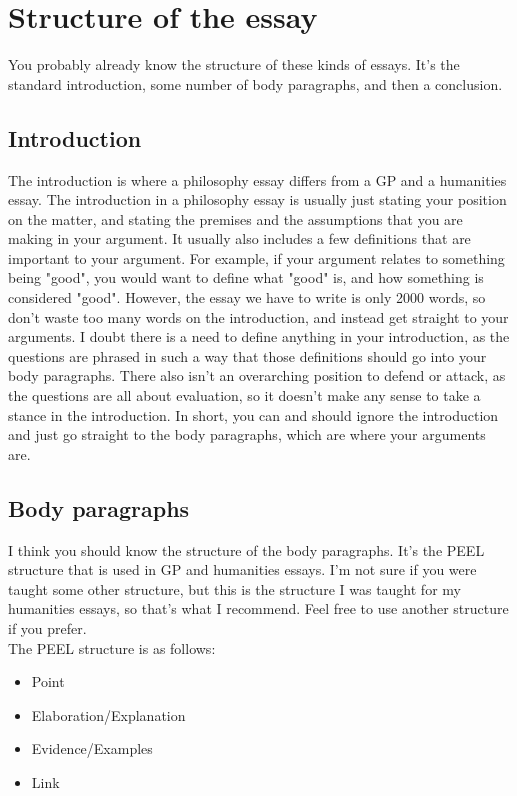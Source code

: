 \documentclass[11pt]{article}
\begin{document}
\section{Structure of the essay}
\label{sec:org7a9e99a}
You probably already know the structure of these kinds of essays. It's the standard introduction, some number of body paragraphs, and then a conclusion.
\subsection{Introduction}
\label{sec:org66e816e}
The introduction is where a philosophy essay differs from a GP and a humanities essay. The introduction in a philosophy essay is usually just stating your position on the matter, and stating the premises and the assumptions that you are making in your argument. It usually also includes a few definitions that are important to your argument. For example, if your argument relates to something being "good", you would want to define what "good" is, and how something is considered "good". However, the essay we have to write is only 2000 words, so don't waste too many words on the introduction, and instead get straight to your arguments. I doubt there is a need to define anything in your introduction, as the questions are phrased in such a way that those definitions should go into your body paragraphs. There also isn't an overarching position to defend or attack, as the questions are all about evaluation, so it doesn't make any sense to take a stance in the introduction. In short, you can and should ignore the introduction and just go straight to the body paragraphs, which are where your arguments are.
\subsection{Body paragraphs}
\label{sec:orge210456}
I think you should know the structure of the body paragraphs. It's the PEEL structure that is used in GP and humanities essays. I'm not sure if you were taught some other structure, but this is the structure I was taught for my humanities essays, so that's what I recommend. Feel free to use another structure if you prefer.  \\

The PEEL structure is as follows:
\begin{itemize}
\item Point
\item Elaboration/Explanation
\item Evidence/Examples
\item Link
\end{itemize}
\end{document}
